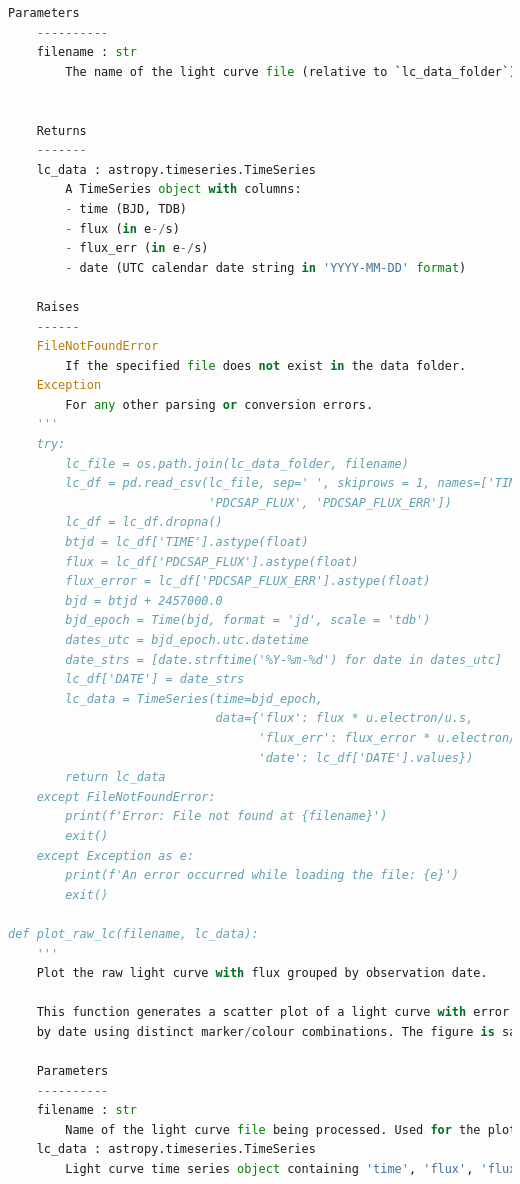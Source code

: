 \documentclass[a4paper,12pt]{article}
\newenvironment{solution}{}{}
\begin{document}
\begin{enumerate}
\begin{solution}
\begin{lstlisting}[language=Python]
    Parameters
    ----------
    filename : str
        The name of the light curve file (relative to `lc_data_folder`).
    
    
    Returns
    -------
    lc_data : astropy.timeseries.TimeSeries
        A TimeSeries object with columns:
        - time (BJD, TDB)
        - flux (in e-/s)
        - flux_err (in e-/s)
        - date (UTC calendar date string in 'YYYY-MM-DD' format)
    
    Raises
    ------
    FileNotFoundError
        If the specified file does not exist in the data folder.
    Exception
        For any other parsing or conversion errors.
    '''
    try:
        lc_file = os.path.join(lc_data_folder, filename)
        lc_df = pd.read_csv(lc_file, sep=' ', skiprows = 1, names=['TIME',
                            'PDCSAP_FLUX', 'PDCSAP_FLUX_ERR'])
        lc_df = lc_df.dropna()
        btjd = lc_df['TIME'].astype(float)
        flux = lc_df['PDCSAP_FLUX'].astype(float)
        flux_error = lc_df['PDCSAP_FLUX_ERR'].astype(float)
        bjd = btjd + 2457000.0
        bjd_epoch = Time(bjd, format = 'jd', scale = 'tdb')
        dates_utc = bjd_epoch.utc.datetime
        date_strs = [date.strftime('%Y-%m-%d') for date in dates_utc]
        lc_df['DATE'] = date_strs
        lc_data = TimeSeries(time=bjd_epoch,
                             data={'flux': flux * u.electron/u.s,
                                   'flux_err': flux_error * u.electron/u.s,
                                   'date': lc_df['DATE'].values})
        return lc_data
    except FileNotFoundError:
        print(f'Error: File not found at {filename}')
        exit()
    except Exception as e:
        print(f'An error occurred while loading the file: {e}')
        exit()

def plot_raw_lc(filename, lc_data):
    '''
    Plot the raw light curve with flux grouped by observation date.

    This function generates a scatter plot of a light curve with error bars, grouping points
    by date using distinct marker/colour combinations. The figure is saved to a PDF file.

    Parameters
    ----------
    filename : str
        Name of the light curve file being processed. Used for the plot title and output filename.
    lc_data : astropy.timeseries.TimeSeries
        Light curve time series object containing 'time', 'flux', 'flux_err', and 'date' columns.


\end{lstlisting}
\end{solution}
\end{enumerate}
\end{document}
